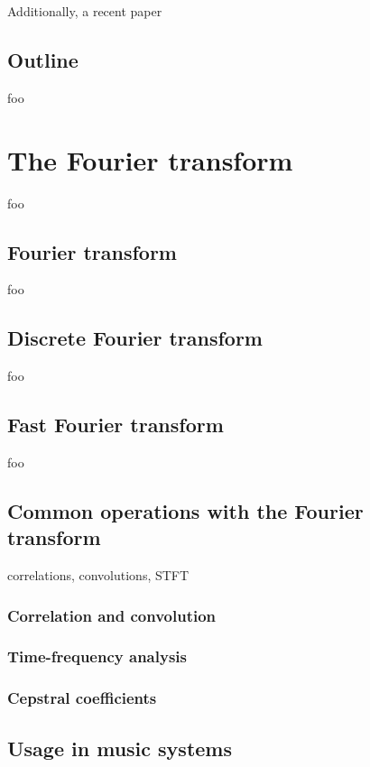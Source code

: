 \documentclass[letter,12pt]{article}
\begin{document}
Additionally, a recent paper 

\subsection{Outline}

foo

\section{The Fourier transform}

foo

\subsection{Fourier transform}

foo

\subsection{Discrete Fourier transform}

foo

\subsection{Fast Fourier transform}

foo

\subsection{Common operations with the Fourier transform}

correlations, convolutions, STFT

\subsubsection{Correlation and convolution}

\subsubsection{Time-frequency analysis}

\subsubsection{Cepstral coefficients}

\subsection{Usage in music systems}
\end{document}
